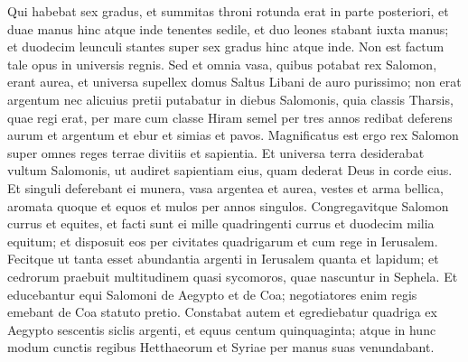 \begin{biblechapter}
\begin{biblechapter}
\begin{biblechapter}
\begin{biblechapter}
\begin{biblechapter}
\begin{biblechapter}
\begin{biblechapter}
\begin{biblechapter}
\begin{biblechapter}
\begin{biblechapter}
\verse Qui habebat sex gradus, et summitas throni rotunda erat in parte posteriori, et duae manus hinc atque inde tenentes sedile, et duo leones stabant iuxta manus; 
\verse et duodecim leunculi stantes super sex gradus hinc atque inde. Non est factum tale opus in universis regnis.
 \verse Sed et omnia vasa, quibus potabat rex Salomon, erant aurea, et universa supellex domus Saltus Libani de auro purissimo; non erat argentum nec alicuius pretii putabatur in diebus Salomonis, 
\verse quia classis Tharsis, quae regi erat, per mare cum classe Hiram semel per tres annos redibat deferens aurum et argentum et ebur et simias et pavos. 
\verse Magnificatus est ergo rex Salomon super omnes reges terrae divitiis et sapientia. 
\verse Et universa terra desiderabat vultum Salomonis, ut audiret sapientiam eius, quam dederat Deus in corde eius. 
\verse Et singuli deferebant ei munera, vasa argentea et aurea, vestes et arma bellica, aromata quoque et equos et mulos per annos singulos.
 \verse Congregavitque Salomon currus et equites, et facti sunt ei mille quadringenti currus et duodecim milia equitum; et disposuit eos per civitates quadrigarum et cum rege in Ierusalem. 
\verse Fecitque ut tanta esset abundantia argenti in Ierusalem quanta et lapidum; et cedrorum praebuit multitudinem quasi sycomoros, quae nascuntur in Sephela. 
\verse Et educebantur equi Salomoni de Aegypto et de Coa; negotiatores enim regis emebant de Coa statuto pretio. 
\verse Constabat autem et egrediebatur quadriga ex Aegypto sescentis siclis argenti, et equus centum quinquaginta; atque in hunc modum cunctis regibus Hetthaeorum et Syriae per manus suas venundabant.
 

\end{biblechapter}
\end{biblechapter}
\end{biblechapter}
\end{biblechapter}
\end{biblechapter}
\end{biblechapter}
\end{biblechapter}
\end{biblechapter}
\end{biblechapter}
\end{biblechapter}
